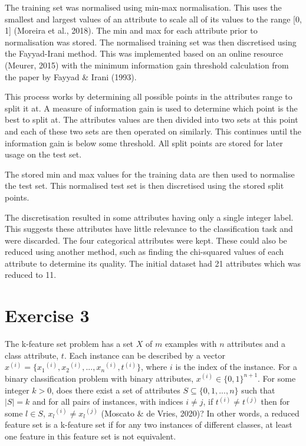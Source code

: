 \documentclass[11pt, a4paper]{article}
\begin{document}
The training set was normalised using min-max normalisation. This uses the smallest and largest values of an attribute to scale all of its values to the range [0, 1] (Moreira et al., 2018). The min and max for each attribute prior to normalisation was stored. The normalised training set was then discretised using the Fayyad-Irani method. This was implemented based on an online resource (Meurer, 2015) with the minimum information gain threshold calculation from the paper by Fayyad \& Irani (1993).

This process works by determining all possible points in the attributes range to split it at. A measure of information gain is used to determine which point is the best to split at. The attributes values are then divided into two sets at this point and each of these two sets are then operated on similarly. This continues until the information gain is below some threshold. All split points are stored for later usage on the test set.

The stored min and max values for the training data are then used to normalise the test set. This normalised test set is then discretised using the stored split points.

The discretisation resulted in some attributes having only a single integer label. This suggests these attributes have little relevance to the classification task and were discarded. The four categorical attributes were kept. These could also be reduced using another method, such as finding the chi-squared values of each attribute to determine its quality. The initial dataset had 21 attributes which was reduced to 11.

\section{Exercise 3}
The k-feature set problem has a set $X$ of $m$ examples with $n$ attributes and a class attribute, $t$. Each instance can be described by a vector $x^{(i)} = \{{x_1}^{(i)}, {x_2}^{(i)}, ..., {x_n}^{(i)}, t^{(i)}\}$, where $i$ is the index of the instance. For a binary classification problem with binary attributes, $x^{(i)} \in \{0, 1\}^{n+1}$. For some integer $k > 0$, does there exist a set of attributes $S \subseteq \{0, 1, ..., n\}$ such that $|S| = k$ and for all pairs of instances, with indices $i \neq j$, if $t^{(i)} \neq t^{(j)}$ then for some $l \in S$, ${x_l}^{(i)} \neq {x_l}^{(j)}$	 (Moscato \& de Vries, 2020)? In other words, a reduced feature set is a k-feature set if for any two instances of different classes, at least one feature in this feature set is not equivalent.
\end{document}

